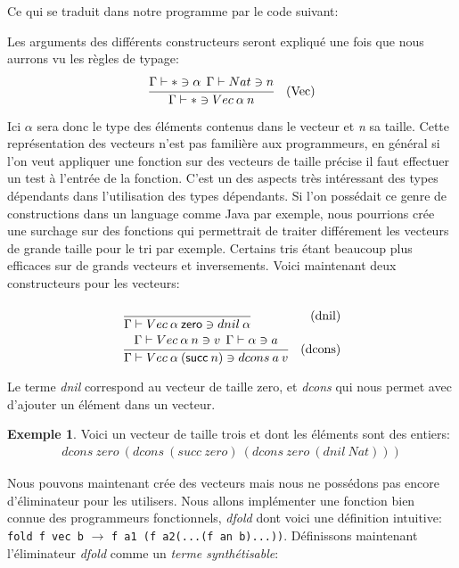 \documentclass {article}
\newcommand{\codefrom}[3]
           {}
\theoremstyle{definition}
\newtheorem{example}{Exemple}
\theoremstyle{remark}
\newcommand{\fun}[1]{\lstinline!#1!}
\begin{document}
Ce qui se traduit dans notre programme par le code suivant:
\codefrom{dependent}{lambda}{terme_vector}
\codefrom{dependent}{lambda}{terme_dfold}



Les arguments des différents constructeurs seront expliqué une fois que nous aurrons vu les 
règles de typage:
\begin{align*}
  &\cfrac{\Gamma\vdash * \ni \alpha\:\:\Gamma\vdash Nat \ni n}
  {\Gamma\vdash * \ni Vec\: \alpha\:n }&\mbox{(Vec)} \\
\end{align*}




Ici $\alpha$ sera donc le type des éléments contenus dans le vecteur et \emph{n} sa taille. 
Cette représentation des vecteurs n'est pas familière aux programmeurs, en général si l'on veut appliquer une fonction sur des vecteurs 
de taille précise il faut effectuer un test à l'entrée de la fonction. C'est un des aspects très intéressant des types dépendants dans 
l'utilisation des types dépendants. Si l'on possédait ce genre de constructions dans un language comme Java par exemple, nous
pourrions crée une surchage sur des fonctions qui permettrait de traiter différement les vecteurs de grande taille pour le tri par exemple.
Certains tris étant beaucoup plus efficaces sur de grands vecteurs et inversements. 
Voici maintenant deux constructeurs pour les vecteurs:
\begin{align*}
  &\cfrac{}
  {\Gamma\vdash Vec\:\alpha\:\mathsf{zero} \ni dnil\:\alpha}&\mbox{(dnil)} \\
  &\cfrac{\Gamma\vdash Vec\:\alpha\:n\ni v \:\:\Gamma\vdash \alpha\ni a}
  {\Gamma\vdash Vec\:\alpha\:(\mathsf{succ}\:n)\ni dcons\:a\:v}&\mbox{(dcons)} \\
\end{align*}

Le terme \emph{dnil} correspond au vecteur de taille zero, et \emph{dcons} qui nous permet avec d'ajouter un élément dans un vecteur.
\begin{example}
  Voici un vecteur de taille trois et dont les éléments sont des entiers:
  \begin{align*}
    dcons\:zero\:(dcons\:(succ\:zero)\:(dcons\:zero\:(dnil\:Nat)))
  \end{align*}  
\end{example}

Nous pouvons maintenant crée des vecteurs mais nous ne possédons pas encore d'éliminateur pour les utilisers. Nous allons 
implémenter une fonction bien connue des programmeurs fonctionnels, \emph{dfold} dont voici une définition intuitive:
\fun{fold f vec b} $\rightarrow$ \fun{f a1 (f a2(...(f an b)...))}.
Définissons maintenant l'éliminateur \emph{dfold} comme un \emph{terme synthétisable}:
\end{document}
